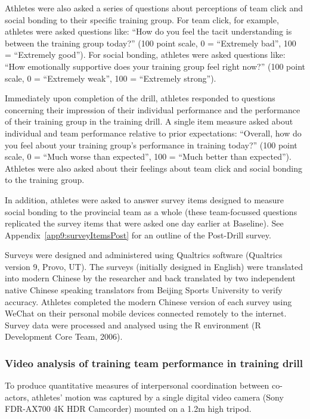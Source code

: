 \begin{CJK}{UTF8}{gbsn}
Athletes were also asked a series of questions about perceptions of team click and social bonding to their specific training group. For team click, for example, athletes were asked questions like: ``How do you feel the tacit understanding is between the training group today?'' (100 point scale, 0 = ``Extremely bad'', 100 = ``Extremely good'').  For social bonding, athletes were asked questions like: ``How emotionally supportive does your training group feel right now?'' (100 point scale, 0 = ``Extremely weak'', 100 = ``Extremely strong'').


Immediately upon completion of the drill, athletes responded to questions concerning their impression of their individual performance and the performance of their training group in the training drill. A  single item measure asked about individual and team performance relative to prior expectations: ``Overall, how do you feel about your training group's performance in training today?'' (100 point scale, 0 = ``Much worse than expected'', 100 = ``Much better than expected'').  Athletes were also asked about their feelings about team click and social bonding to the training group.

In addition, athletes were asked to answer survey items designed to measure social bonding to the provincial team as a whole (these team-focussed questions replicated the survey items that were asked one day earlier at Baseline).  See Appendix~\ref{app9:surveyItemsPost} for an outline of the Post-Drill survey.

Surveys were designed and administered using Qualtrics software (Qualtrics version 9, Provo, UT). The surveys (initially designed in English) were translated into modern Chinese by the researcher and back translated by two independent native Chinese speaking translators from Beijing Sports University to verify accuracy.  Athletes completed the modern Chinese version of each survey using WeChat on their personal mobile devices connected remotely to the internet. Survey data were processed and analysed using the R environment (R Development Core Team, 2006).

\subsubsection{Video analysis of training team performance in training drill\label{sec:videoAnalysis}}
To produce quantitative measures of interpersonal coordination between co-actors, athletes' motion was captured by a single digital video camera (Sony FDR-AX700 4K HDR Camcorder) mounted on a 1.2m high tripod.


\end{CJK}
